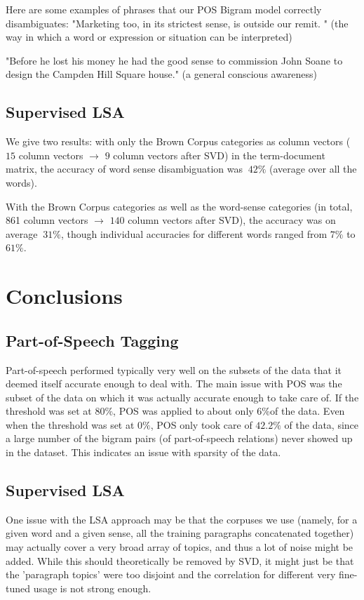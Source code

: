 \documentclass[10pt, letterpaper]{article}
\begin{document}
	Here are some examples of phrases that our POS Bigram model correctly disambiguates:
	"Marketing too, in its strictest sense, is outside our remit. " (the way in which a word or expression or situation can be interpreted)	

	"Before he lost his money he had the good sense to commission John Soane to design the Campden Hill Square house." (a general conscious awareness)

	\subsection{Supervised LSA}
	
	We give two results: 
	with only the Brown Corpus categories as column vectors ($15$ column vectors $\rightarrow$ $9$ column vectors after SVD) in the term-document matrix, the accuracy of word sense disambiguation was $ ~ 42\%$ (average over all the words). 
   
    With the Brown Corpus categories as well as the word-sense categories (in total, 861 column vectors $\rightarrow$ $140$ column vectors after SVD), the accuracy was on average $ ~ 31\%$, though individual accuracies for different words ranged from $7\%$ to $61\%$. 
    
	

	\section{Conclusions}

	\subsection{Part-of-Speech Tagging}

	Part-of-speech performed typically very well on the subsets of the data that it deemed itself accurate enough to deal with. The main issue with POS was the subset of the data on which it was actually accurate enough to take care of. If the threshold was set at $80\%$, POS was applied to about only $6\%$of the data. Even when the threshold was set at $0\%$, POS only took care of $42.2\%$ of the data, since
	a large number of the bigram pairs (of part-of-speech relations) never showed up in the dataset. This indicates an issue with sparsity of the data.

	\subsection{Supervised LSA}
	One issue with the LSA approach may be that the corpuses we use (namely, for a given word and a given sense, all the training paragraphs concatenated together) may actually cover a very broad array of topics, and thus a lot of noise might be added. While this should theoretically be removed by SVD, it might just be that the 'paragraph topics' were too disjoint and the correlation for different very fine-tuned usage is not strong enough. 
	
\end{document}
